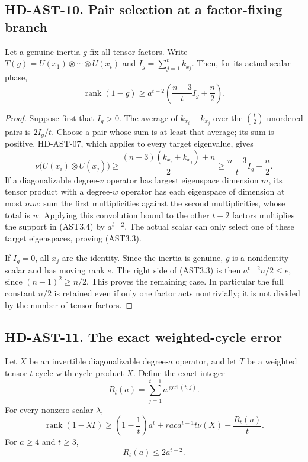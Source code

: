 \subsection*{HD-AST-10. Pair selection at a factor-fixing branch}

\begin{lemma}[HD-AST-10]
Let a genuine inertia $g$ fix all tensor factors.  Write
$T(g)=U(x_1)\otimes\cdots\otimes U(x_t)$ and
$I_g=\sum_{j=1}^t k_{x_j}$.  Then, for its actual scalar phase,
\[
 \operatorname{rank}(1-g)\ge
 a^{t-2}\left(\frac{n-3}{t}I_g+\frac n2\right).                \tag{AST3.3}
\]
\end{lemma}

\begin{proof}
Suppose first that $I_g>0$.  The average of $k_{x_i}+k_{x_j}$
over the $\binom t2$ unordered pairs is $2I_g/t$.  Choose a pair
whose sum is at least that average; its sum is positive.
HD-AST-07, which applies to every target eigenvalue, gives
\[
 \nu\bigl(U(x_i)\otimes U(x_j)\bigr)
 \ge\frac{(n-3)(k_{x_i}+k_{x_j})+n}{2}
 \ge\frac{n-3}{t}I_g+\frac n2.                               \tag{AST3.4}
\]
If a diagonalizable degree-$v$ operator has largest eigenspace
dimension $m$, its tensor product with a degree-$w$ operator has
each eigenspace of dimension at most $mw$: sum the first
multiplicities against the second multiplicities, whose total is
$w$.  Applying this convolution bound to the other $t-2$ factors
multiplies the support in (AST3.4) by $a^{t-2}$.  The actual
scalar can only select one of these target eigenspaces, proving
(AST3.3).

If $I_g=0$, all $x_j$ are the identity.  Since the inertia is
genuine, $g$ is a nonidentity scalar and has moving rank $e$.
The right side of (AST3.3) is then $a^{t-2}n/2\le e$, since
$(n-1)^2\ge n/2$.  This proves the remaining case.  In particular
the full constant $n/2$ is retained even if only one factor acts
nontrivially; it is not divided by the number of tensor factors.
\end{proof}

\subsection*{HD-AST-11. The exact weighted-cycle error}

\begin{lemma}
Let $X$ be an invertible diagonalizable degree-$a$ operator, and
let $T$ be a weighted tensor $t$-cycle with cycle product $X$.
Define the exact integer
\[
                 R_t(a)=\sum_{j=1}^{t-1}a^{\gcd(t,j)}.          \tag{AST3.5}
\]
For every nonzero scalar $\lambda$,
\[
 \operatorname{rank}(1-\lambda T)\ge
 \left(1-\frac1t\right)a^t+rac{a^{t-1}}t\nu(X)
                          -\frac{R_t(a)}t.                    \tag{AST3.6}
\]
For $a\ge4$ and $t\ge3$,
\[
                          R_t(a)\le2a^{t-2}.                  \tag{AST3.7}
\]
\end{lemma}

